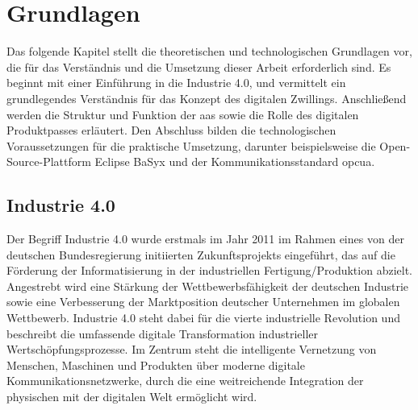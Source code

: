 \section{Grundlagen}
Das folgende Kapitel stellt die theoretischen und technologischen Grundlagen vor, die für das Verständnis und die Umsetzung dieser Arbeit erforderlich sind.
Es beginnt mit einer Einführung in die Industrie 4.0, und vermittelt ein grundlegendes Verständnis für das Konzept des digitalen Zwillings.
Anschließend werden die Struktur und Funktion der \acs{aas} sowie die Rolle des digitalen Produktpasses erläutert.
Den Abschluss bilden die technologischen Voraussetzungen für die praktische Umsetzung, darunter beispielsweise die Open-Source-Plattform Eclipse BaSyx und der Kommunikationsstandard \acs{opcua}.
\subsection{Industrie 4.0}

Der Begriff Industrie 4.0 wurde erstmals im Jahr 2011 im Rahmen eines von der deutschen Bundesregierung initiierten Zukunftsprojekts eingeführt, das auf die Förderung der Informatisierung in der industriellen Fertigung/Produktion abzielt.
Angestrebt wird eine Stärkung der Wettbewerbsfähigkeit der deutschen Industrie sowie eine Verbesserung der Marktposition deutscher Unternehmen im globalen Wettbewerb.
Industrie 4.0 steht dabei für die vierte industrielle Revolution und beschreibt die umfassende digitale Transformation industrieller Wertschöpfungsprozesse. 
Im Zentrum steht die intelligente Vernetzung von Menschen, Maschinen und Produkten über moderne digitale Kommunikationsnetzwerke, durch die eine weitreichende Integration der physischen mit der digitalen Welt ermöglicht wird.

